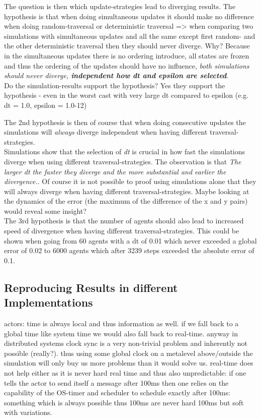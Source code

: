 The question is then which update-strategies lead to diverging results. The hypothesis is that when doing simultaneous updates it should make no difference when doing random-traversal or deterministic traversal => when comparing two simulations with simultaneous updates and all the same except first random- and the other deterministic traversal then they should never diverge. Why? Because in the simultaneous updates there is no ordering introduce, all states are frozen and thus the ordering of the updates should have no influence, \textit{both simulations should never diverge, \textbf{independent how dt and epsilon are selected}}. \\
Do the simulation-results support the hypothesis? Yes they support the hypothesis - even in the worst cast with very large dt compared to epsilon (e.g. dt = 1.0, epsilon = 1.0-12)

The 2nd hypothesis is then of course that when doing consecutive updates the simulations will \textit{always} diverge independent when having different traversal-strategies. \\
Simulations show that the selection of \textit{dt} is crucial in how fast the simulations diverge when using different traversal-strategies. The observation is that \textit{The larger dt the faster they diverge and the more substantial and earlier the divergence.}. Of course it is not possible to proof using simulations alone that they will always diverge when having different traversal-strategies. Maybe looking at the dynamics of the error (the maximum of the difference of the x and y pairs) would reveal some insight? \\

The 3rd hypothesis is that the number of agents should also lead to increased speed of divergence when having different traversal-strategies. This could be shown when going from 60 agents with a dt of 0.01 which never exceeded a global error of 0.02 to 6000 agents which after 3239 steps exceeded the absolute error of 0.1.

\subsection{Reproducing Results in different Implementations}
actors: time is always local and thus information as well. if we fall back to a global time like system time we would also fall back to real-time. anyway in distributed systems clock sync is a very non-trivial problem and inherently not possible (really?). thus using some global clock on a metalevel above/outside the simulation will only buy us more problems than it would solve us. real-time does not help either as it is never hard real time and thus also unpredictable: if one tells the actor to send itself a message after 100ms then one relies on the capability of the OS-timer and scheduler to schedule exactly after 100ms: something which is always possible thus 100ms are never hard 100ms but soft with variations.

